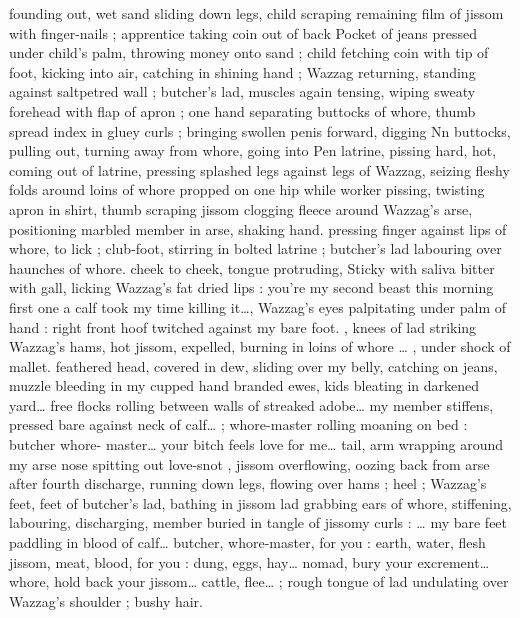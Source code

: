 founding out, wet sand sliding down legs, child scraping remaining 
film of jissom with finger-nails ; apprentice taking coin out of back 
Pocket of jeans pressed under child's palm, throwing money onto 
sand ; child fetching coin with tip of foot, kicking into air, catching in 
shining hand ; Wazzag returning, standing against saltpetred wall ; 
butcher's lad, muscles again tensing, wiping sweaty forehead with 
flap of apron ; one hand separating buttocks of whore, thumb spread 
index in gluey curls ; bringing swollen penis forward, digging 
Nn buttocks, pulling out, turning away from whore, going into 
Pen latrine, pissing hard, hot, coming out of latrine, pressing 
splashed legs against legs of Wazzag, seizing fleshy folds around 
loins of whore propped on one hip while worker pissing, twisting 
apron in shirt, thumb scraping jissom clogging fleece around 
Wazzag's arse, positioning marbled member in arse, shaking hand. 
pressing finger against lips of whore, to lick ; club-foot, stirring in 
bolted latrine ; butcher's lad labouring over haunches of whore. 
cheek to cheek, tongue protruding, Sticky with saliva bitter with gall, 
licking Wazzag's fat dried lips : {\gl}{\td} you're my second beast this 
morning{\td} first one a calf{\td} took my time killing it{\ldots}{\gr}, Wazzag's eyes 
palpitating under palm of hand : {\gl}{\td} right front hoof twitched against 
my bare foot. {\gr}, knees of lad striking Wazzag's hams, hot jissom, 
expelled, burning in loins of whore {\ldots} {\gl}, under shock of mallet. 
feathered head, covered in dew, sliding over my belly, catching on 
jeans, muzzle bleeding in my cupped hand{\td} branded ewes, kids 
bleating in darkened yard{\ldots} free flocks rolling between walls of 
streaked adobe{\ldots} my member stiffens, pressed bare against neck of 
calf{\ldots}{\gr} ; whore-master rolling moaning on bed : {\gl} butcher{\td} whore- 
master{\ldots} your bitch feels love for me{\ldots} tail, arm wrapping around my 
arse{\td} nose spitting out love-snot{\td} {\gr}, jissom overflowing, oozing back 
from arse after fourth discharge, running down legs, flowing over 
hams ; heel ; Wazzag's feet, feet of butcher's lad, bathing in jissom 
lad grabbing ears of whore, stiffening, labouring, discharging, 
member buried in tangle of jissomy curls : {\gl}{\ldots} my bare feet paddling 
in blood of calf{\ldots} butcher, whore-master, for you : earth, water, flesh 
jissom, meat, blood, for you : dung, eggs, hay{\ldots} nomad, bury your 
excrement{\ldots} whore, hold back your jissom{\ldots} cattle, flee{\ldots} {\gr} ; rough 
tongue of lad undulating over Wazzag's shoulder ; bushy hair. 

